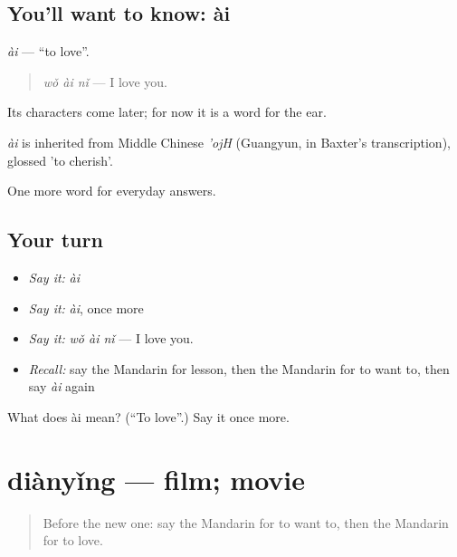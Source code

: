 \subsection*{You'll want to know: ài}
\emph{ài} — \textquotedblleft{}to love\textquotedblright{}.

\begin{quote}
\emph{wǒ ài nǐ} — I love you.
\end{quote}

Its characters come later; for now it is a word for the ear.

\begin{cousinweb}
\emph{ài} is inherited from Middle Chinese \emph{'ojH} (Guangyun, in Baxter's transcription), glossed 'to cherish'.
\end{cousinweb}

\begin{grammarlens}[title={What you've built}]
One more word for everyday answers.
\end{grammarlens}

\subsection*{Your turn}
\begin{itemize}
\raggedright
  \item \emph{Say it:} \emph{ài}
  \item \emph{Say it:} \emph{ài}, once more
  \item \emph{Say it:} \emph{wǒ ài nǐ} — I love you.
  \item \emph{Recall:} say the Mandarin for lesson, then the Mandarin for to want to, then say \emph{ài} again
\end{itemize}

\begin{tcolorbox}[breakable,colback=teal!4,colframe=teal!35!black,title={Before you move on}]
What does ài mean? (\textquotedblleft{}To love\textquotedblright{}.) Say it once more.
\end{tcolorbox}
\section[diànyǐng]{diànyǐng — film; movie}

\label{lesson:ZH-C55-dianying}



\begin{quote}
Before the new one: say the Mandarin for to want to, then the Mandarin for to love.
\end{quote}

